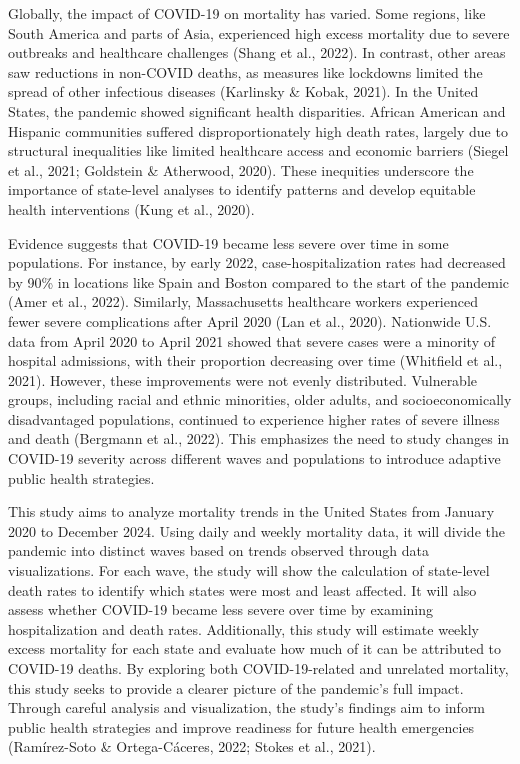 \documentclass[
  letterpaper,
  DIV=11,
  numbers=noendperiod]{scrartcl}
\begin{document}
Globally, the impact of COVID-19 on mortality has varied. Some regions,
like South America and parts of Asia, experienced high excess mortality
due to severe outbreaks and healthcare challenges (Shang et al., 2022).
In contrast, other areas saw reductions in non-COVID deaths, as measures
like lockdowns limited the spread of other infectious diseases
(Karlinsky \& Kobak, 2021). In the United States, the pandemic showed
significant health disparities. African American and Hispanic
communities suffered disproportionately high death rates, largely due to
structural inequalities like limited healthcare access and economic
barriers (Siegel et al., 2021; Goldstein \& Atherwood, 2020). These
inequities underscore the importance of state-level analyses to identify
patterns and develop equitable health interventions (Kung et al., 2020).

Evidence suggests that COVID-19 became less severe over time in some
populations. For instance, by early 2022, case-hospitalization rates had
decreased by 90\% in locations like Spain and Boston compared to the
start of the pandemic (Amer et al., 2022). Similarly, Massachusetts
healthcare workers experienced fewer severe complications after April
2020 (Lan et al., 2020). Nationwide U.S. data from April 2020 to April
2021 showed that severe cases were a minority of hospital admissions,
with their proportion decreasing over time (Whitfield et al., 2021).
However, these improvements were not evenly distributed. Vulnerable
groups, including racial and ethnic minorities, older adults, and
socioeconomically disadvantaged populations, continued to experience
higher rates of severe illness and death (Bergmann et al., 2022). This
emphasizes the need to study changes in COVID-19 severity across
different waves and populations to introduce adaptive public health
strategies.

This study aims to analyze mortality trends in the United States from
January 2020 to December 2024. Using daily and weekly mortality data, it
will divide the pandemic into distinct waves based on trends observed
through data visualizations. For each wave, the study will show the
calculation of state-level death rates to identify which states were
most and least affected. It will also assess whether COVID-19 became
less severe over time by examining hospitalization and death rates.
Additionally, this study will estimate weekly excess mortality for each
state and evaluate how much of it can be attributed to COVID-19 deaths.
By exploring both COVID-19-related and unrelated mortality, this study
seeks to provide a clearer picture of the pandemic's full impact.
Through careful analysis and visualization, the study's findings aim to
inform public health strategies and improve readiness for future health
emergencies (Ramírez-Soto \& Ortega-Cáceres, 2022; Stokes et al., 2021).
\end{document}
